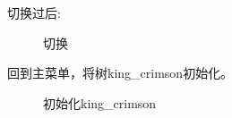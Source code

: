 \documentclass[supercite]{Experimental_Report}
\theoremstyle{definition}
\begin{document}
\noindent
切换过后:
\begin{figure}[htbp]
	\centering
	\centering
	\caption{切换}
	\label{fig5-88}
\end{figure}

\clearpage
\noindent
回到主菜单，将树king\_crimson初始化。
\begin{figure}[htbp]
	\centering
	\centering
	\caption{初始化king\_crimson}
	\label{fig5-89}
\end{figure}
\end{document}
